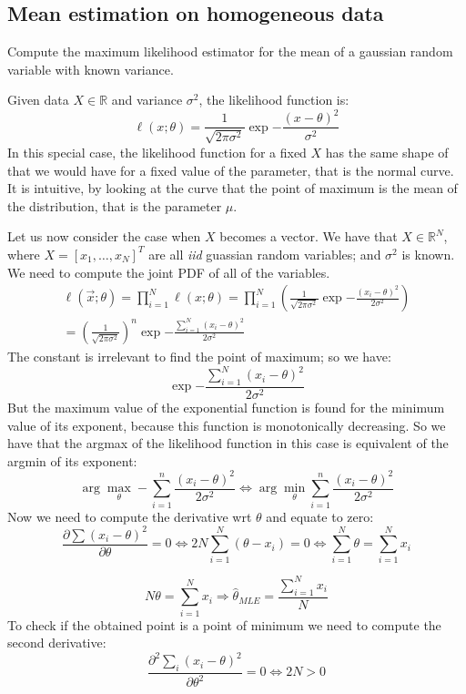 \subsection{Mean estimation on homogeneous data}
\begin{exercise}
    Compute the maximum likelihood estimator for the mean of a gaussian random variable with known variance.
\end{exercise}
Given data $X \in \mathbb{R}$ and variance $\sigma^2$, the likelihood function is:
\[
    \ell(x;\theta) = \frac{1}{\sqrt{2\pi\sigma^2}} \exp{-\frac{(x-\theta)^2}{\sigma^2}}
\]
In this special case, the likelihood function for a fixed $X$ has the same shape of that we would have for a fixed value of the parameter, that is the normal curve. It is intuitive, by looking at the curve that the point of maximum is the mean of the distribution, that is the parameter $\mu$.

Let us now consider the case when $X$ becomes a vector. We have that $X \in \mathbb{R}^N$, where
$X = \left[x_1, \dots, x_N\right]^T$ are all \textit{iid} guassian random variables; and $\sigma^2$ is known. We need to compute the joint PDF of all of the variables.
\begin{align*}
    \ell(\vec{x};\theta) = \prod_{i=1}^{N} \ell(x;\theta) = \prod_{i=1}^{N} \left(\frac{1}{\sqrt{2\pi\sigma^2}} \exp{-\frac{(x_i - \theta)^2}{2\sigma^2}}\right) \\
    = \left(\frac{1}{\sqrt{2\pi\sigma^2}}\right)^n \exp{-\frac{\sum_{i=1}^{N} (x_i - \theta)^2}{2\sigma^2}}
\end{align*}
The constant is irrelevant to find the point of maximum; so we have:
\[
    \exp{-\frac{\sum_{i=1}^{N} (x_i - \theta)^2}{2\sigma^2}}
\]
But the maximum value of the exponential function is found for the minimum value of its exponent, because this function is monotonically decreasing. So we have that the argmax of the likelihood function in this case is equivalent of the argmin of its exponent:
\[
    \arg\max_{\theta} - \sum_{i = 1}^{n} \frac{(x_i - \theta)^2}{2 \sigma^2} \Leftrightarrow \arg\min_{\theta} \sum_{i = 1}^{n} \frac{(x_i - \theta)^2}{2 \sigma^2}
\]
Now we need to compute the derivative wrt $\theta$ and equate to zero:
\[
    \frac{\partial \sum(x_i-\theta)^2}{\partial \theta} = 0 \Leftrightarrow 2N\sum_{i=1}^N(\theta - x_i) = 0 \Leftrightarrow \sum_{i=1}^N \theta = \sum_{i=1}^N x_i \]

\[
    N\theta = \sum_{i=1}^N x_i \Rightarrow \hat{\theta}_{MLE}  = \frac{\sum_{i=1}^N x_i}{N}
\]
To check if the obtained point is a point of minimum we need to compute the second derivative:
\[
    \frac{\partial^2 \sum_i(x_i-\theta)^2}{\partial \theta^2} = 0 \Leftrightarrow 2N > 0
\]

